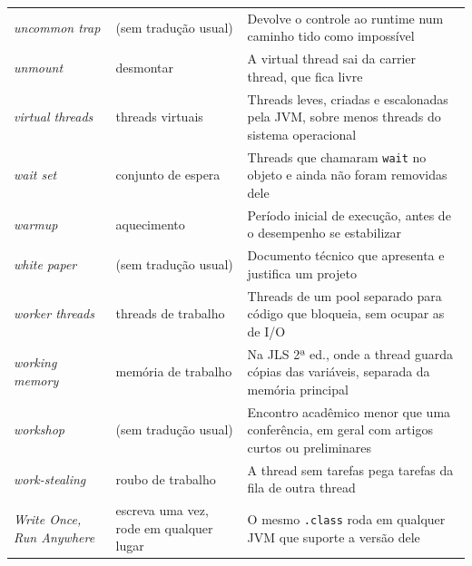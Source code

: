 \begin{longtable}{@{}>{\raggedright}p{3.9cm} >{\raggedright}p{3.6cm} >{\raggedright\arraybackslash}p{6.3cm}@{}}
\textit{uncommon trap} & (sem tradução usual) & Devolve o controle ao runtime num caminho tido como impossível \\
\textit{unmount} & desmontar & A virtual thread sai da carrier thread, que fica livre \\
\textit{virtual threads} & threads virtuais & Threads leves, criadas e escalonadas pela JVM, sobre menos threads do sistema operacional \\
\textit{wait set} & conjunto de espera & Threads que chamaram \texttt{wait} no objeto e ainda não foram removidas dele \\
\textit{warmup} & aquecimento & Período inicial de execução, antes de o desempenho se estabilizar \\
\textit{white paper} & (sem tradução usual) & Documento técnico que apresenta e justifica um projeto \\
\textit{worker threads} & threads de trabalho & Threads de um pool separado para código que bloqueia, sem ocupar as de I/O \\
\textit{working memory} & memória de trabalho & Na JLS 2ª ed., onde a thread guarda cópias das variáveis, separada da memória principal \\
\textit{workshop} & (sem tradução usual) & Encontro acadêmico menor que uma conferência, em geral com artigos curtos ou preliminares \\
\textit{work-stealing} & roubo de trabalho & A thread sem tarefas pega tarefas da fila de outra thread \\
\textit{Write Once, Run Anywhere} & escreva uma vez, rode em qualquer lugar & O mesmo \texttt{.class} roda em qualquer JVM que suporte a versão dele \\
\bottomrule
\end{longtable}
\normalsize
